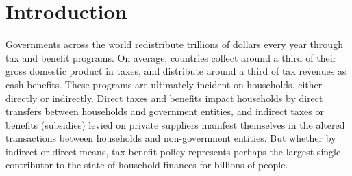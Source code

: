 \documentclass[twocolumn]{article}
\begin{document}





% 
% 

\section{Introduction}
Governments across the world redistribute trillions of dollars every year through tax and benefit programs. On average, countries collect around a third of their gross domestic product in taxes, and distribute around a third of tax revenues as cash benefits. These programs are ultimately incident on households, either directly or indirectly. Direct taxes and benefits impact households by direct transfers between households and government entities, and indirect taxes or benefits (subsidies) levied on private suppliers manifest themselves in the altered transactions between households and non-government entities. But whether by indirect or direct means, tax-benefit policy represents perhaps the largest single contributor to the state of household finances for billions of people. 
\end{document}
